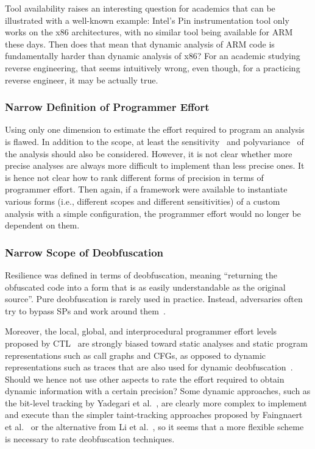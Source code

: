 Tool availability raises an interesting question for academics that can be illustrated with a well-known example: Intel's Pin instrumentation tool only works on the x86 architectures, with no similar tool being available for ARM these days. Then does that mean that dynamic analysis of ARM code is fundamentally harder than dynamic analysis of x86? For an academic studying reverse engineering, that seems intuitively wrong, even though, for a practicing reverse engineer, it may be actually true.

\subsubsection{Narrow Definition of Programmer Effort}
Using only one dimension to estimate the effort required to program an analysis is flawed. In addition to the scope, at least the sensitivity~\cite{path-sensitive} and polyvariance~\cite{polyvariance} of the analysis should also be considered.  However, it is not clear whether more precise analyses are always more difficult to implement than less precise ones. It is hence not clear how to rank different forms of precision in terms of programmer effort. Then again, if a framework were available to instantiate various forms (i.e., different scopes and different sensitivities) of a custom analysis with a simple configuration, the programmer effort would no longer be dependent on them. 
   
\subsubsection{Narrow Scope of Deobfuscation}
Resilience was defined in terms of deobfuscation, meaning ``returning the obfuscated code into a form that is as easily understandable as the original source''. Pure deobfuscation is rarely used in practice. Instead, adversaries often try to bypass SPs and work around them~\cite{emse2019}.

Moreover, the local, global, and interprocedural programmer effort levels proposed by CTL~\cite{collberg1997taxonomy} are strongly biased toward static analyses and static program representations such as call graphs and CFGs, as opposed to dynamic representations such as traces that are also used for dynamic deobfuscation~\cite{generic_deobfuscation,mariano24}. Should we hence not use other aspects to rate the effort required to obtain dynamic information with a certain precision? Some dynamic approaches, such as the bit-level tracking by Yadegari et al.~\cite{bitleveltaint}, are clearly more complex to implement and execute than the simpler taint-tracking approaches proposed by Faingnaert et al.~\cite{khunt++} or the alternative from Li et al.~\cite{khunt}, so it seems that a more flexible scheme is necessary to rate deobfuscation techniques.

